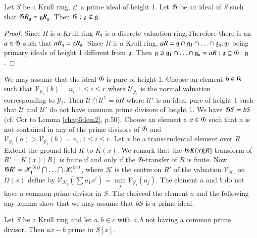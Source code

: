 \begin{lemma*}
  Let $S$ be a Krull ring, $\mathfrak{g}'$ a prime ideal of height 1. Let
  $\mathfrak{G}$ be an ideal of $S$ such that $\mathfrak{G} R_{\mathfrak{g}} =\mathfrak{g} R_{\mathfrak{g}}$. Then $\mathfrak{G}
  :\mathfrak{g} \not\subset \mathfrak{g}$.      
\end{lemma*} 
     
\begin{proof}
  Since $R$ is a Krull ring  $R_{\mathfrak{g}}$ is a discrete valuation
  ring.Therefore there is an $a \in \mathfrak{G} $ such that
  $aR_{\mathfrak{g}}=\mathfrak{g} R_{\mathfrak{g}}$. Since $R$ is a Krull
  ring, $a R=\mathfrak{g} \cap \mathfrak{g}_1 \cap\ldots \cap
  \mathfrak{g}_n ,\mathfrak{g}_i$ being primary ideals of  height 1
  different from $\mathfrak{g}$. Then $\mathfrak{g} \not\supset
  \mathfrak{g}_1 \cap \ldots \cap \mathfrak{g}_n =aR:\mathfrak{g}
  \subseteq \mathfrak{G} :\mathfrak{g}$.     
\end{proof} 

\medskip
{}
   We may assume that the ideal $\mathfrak{G}$ is pure of height 1. Choose an
   element $b \in \mathfrak{G}$ such that $\mathscr{V}_{\mathscr{Y}_i} 
   (b)=n_i,1 \le i \le r$ where $\mathscr{U}_{\mathscr{Y}_i}$ is the
   normal valuation corresponding to $\mathscr{Y}_i$. Then
   $\mathscr{U}\cap \mathscr{U}^1 =bR$  where $\mathscr{U}'$ is an
   ideal pure of height 1 such that $\mathscr{U}$ and $\mathscr{U}'$
   do not have common prime divisors of height 1. We have $\mathfrak{G} S = bS$
   (cf. Cor to Lemma \ref{chap5:lem2}, p.50). Choose an element a
   $a \in \mathfrak{G}$ such that a is not contained in any of the prime
   divisors of $\mathfrak{G}$ and
   $\mathscr{V}_{\mathscr{Y}_i}(a) >\mathscr{V}_{\mathscr{Y}_i}
   (b)=n_i ,1 \le i \le r$. Let $x$ be a transcendental element over
   $R$. Extend the ground field $K$ to $K(x)$. We remark that the 
   $\mathfrak{G} K(x)[R]$-transform of $R'=K(x)[R]$ is finite
   if and only if the $\mathfrak{G}$-transfer of $R$ is finite. Now
   $\mathfrak{G} R' = \mathscr{K}^{(n_1)}_1 \bigcap \ldots \bigcap
   \mathscr{K}^{(n_r)}_r$, where $\mathscr {K}$ is the centre on $R'$
   of the valuation $\mathscr{V}_{\mathscr{K}_i}$ on $\Omega (x)$
   define by $\mathscr{V} _{\mathscr{K}_i}(\sum a_1 x^i)=\min\limits_j
   \mathscr{V}_{\mathscr{Y}_i}(a_j)$. The element $a$ and $b$ do not have a common
   prime divisor in $S$. The choice\pageoriginale of the element $a$
   and the following any lemma show that we may assume that $bS$ is a
   prime ideal.
     
\begin{lemma*}
  Let $S$ be a Krull ring and let $a,b \in c$ with $a,b$ not having a
  common prime divisor. Then $ax-b$ prime in $S[x]$. 
\end{lemma*}
       
